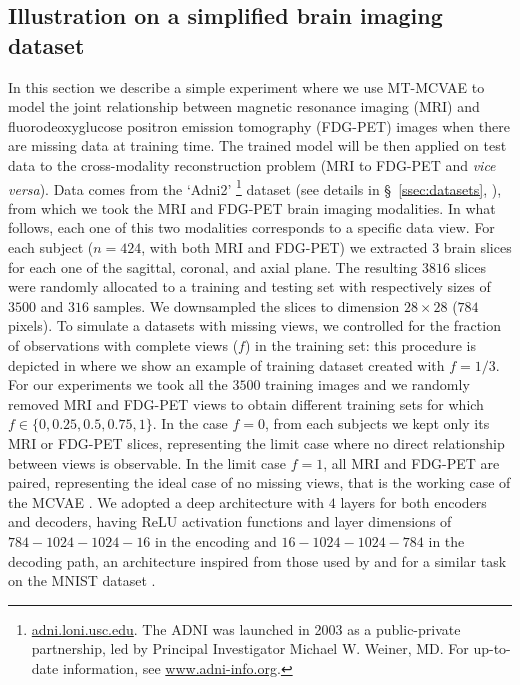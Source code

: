 	\subsection{Illustration on a simplified brain imaging dataset}
	\label{sec:proof_of_concept}
	In this section we describe a simple experiment where we use MT-MCVAE to model the joint relationship between
	magnetic resonance imaging (MRI) and fluorodeoxyglucose positron emission tomography (FDG-PET) images when there are missing data at training time.
	The trained model will be then applied on test data
	to the cross-modality reconstruction problem (MRI to FDG-PET and \textit{vice versa}).
%	
	Data comes from the `Adni2'
	\footnote{
	\href{http://adni.loni.usc.edu}{adni.loni.usc.edu}.
	The ADNI was launched in 2003 as a public-private partnership, led by Principal Investigator Michael W. Weiner, MD. For up-to-date information, see \href{www.adni-info.org}{www.adni-info.org}.
	}
	dataset (see details in \S~\ref{ssec:datasets}, ), from which we took the MRI and FDG-PET brain imaging modalities.
	In what follows, each one of this two modalities corresponds to a specific data view.
	For each subject ($n=424$, with both MRI and FDG-PET) we extracted $3$ brain slices for each one of the sagittal, coronal, and axial plane.
	The resulting $3816$ slices were randomly allocated to a training and testing set with respectively sizes of $3500$ and $316$ samples.
	We downsampled the slices to dimension $28 \times 28$ ($784$ pixels).
	To simulate a datasets with missing views, we controlled for the fraction of observations with complete views ($f$) in the training set:
	this procedure is depicted in  where we show an example of training dataset created with $f=1/3$.
	For our experiments we took all the $3500$ training images and we randomly removed MRI and FDG-PET views to obtain different training sets for which $f \in \{0, 0.25, 0.5, 0.75, 1\}$.
	In the case $f = 0$, from each subjects we kept only its MRI or FDG-PET slices, representing the limit case where no direct relationship between views is observable.
	In the limit case $f = 1$, all MRI and FDG-PET are paired, representing the ideal case of no missing views, that is the working case of the MCVAE \citep{Antelmi2019}.
	We adopted a deep architecture with $4$ layers for both encoders and decoders, having ReLU activation functions and layer dimensions of $784-1024-1024-16$ in the encoding and $16-1024-1024-784$ in the decoding path,
	an architecture inspired from those used by \cite{dcca1} and \cite{dcca2} for a similar task on the MNIST dataset \citep{mnist}.
